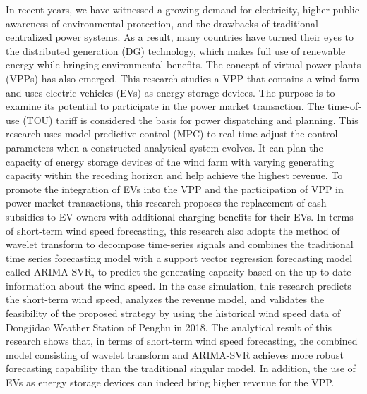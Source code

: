 \begin{abstract*}

  In recent years, we have witnessed a growing demand for electricity, higher public awareness of environmental protection, and the drawbacks of traditional centralized power systems. As a result, many countries have turned their eyes to the distributed generation (DG) technology, which makes full use of renewable energy while bringing environmental benefits. The concept of virtual power plants (VPPs) has also emerged. This research studies a VPP that contains a wind farm and uses electric vehicles (EVs) as energy storage devices. The purpose is to examine its potential to participate in the power market transaction. The time-of-use (TOU) tariff is considered the basis for power dispatching and planning. This research uses model predictive control (MPC) to real-time adjust the control parameters when a constructed analytical system evolves. It can plan the capacity of energy storage devices of the wind farm with varying generating capacity within the receding horizon and help achieve the highest revenue. To promote the integration of EVs into the VPP and the participation of VPP in power market transactions, this research proposes the replacement of cash subsidies to EV owners with additional charging benefits for their EVs. In terms of short-term wind speed forecasting, this research also adopts the method of wavelet transform to decompose time-series signals and combines the traditional time series forecasting model with a support vector regression forecasting model called ARIMA-SVR, to predict the generating capacity based on the up-to-date information about the wind speed. In the case simulation, this research predicts the short-term wind speed, analyzes the revenue model, and validates the feasibility of the proposed strategy by using the historical wind speed data of Dongjidao Weather Station of Penghu in 2018. The analytical result of this research shows that, in terms of short-term wind speed forecasting, the combined model consisting of wavelet transform and ARIMA-SVR achieves more robust forecasting capability than the traditional singular model. In addition, the use of EVs as energy storage devices can indeed bring higher revenue for the VPP.


\end{abstract*}
